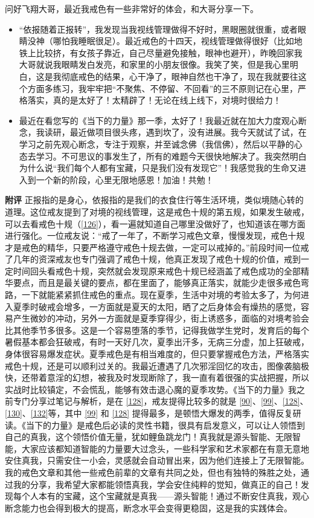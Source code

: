 \begin{case}
    问好飞翔大哥，最近我戒色有一些非常好的体会，和大哥分享一下。

    \begin{itemize}
        \item “依报随着正报转”，我发现当我视线管理做得不好时，黑眼圈就很重，或者眼睛没神（哪怕我睡眠很足）。最近戒色的十四天，视线管理做得很好（比如地铁上比较挤，有女孩子靠近，自己尽量避免接触，眼神也避开），昨晚回家我大哥就说我眼睛发白发亮，和家里的小朋友很像。我笑了笑，但是我心里明白，这是我彻底戒色的结果，心干净了，眼神自然也干净了，现在我就要往这个方面多练习，我牢牢把“不聚焦、不停留、不回看”的三不原则记在心里，严格落实，真的是太好了！太精辟了！无论在线上线下，对境时很给力！
        \item 最近在看您写的《当下的力量》那一季，太好了！我最近就在加大力度观心断念，我读研，最近做项目很头疼，遇到坎了，没有进展。我今天就试了试，在学习之前先观心断念，专注于观察，并至诚念佛（我信佛），然后以平静的心态去学习。不可思议的事发生了，所有的难题今天很快地解决了。我突然明白为什么说“我们每个人都有宝藏，只是我们没有发现它”！我感觉我的生命又进入到一个新的阶段，心里无限地感恩！加油！共勉！
    \end{itemize}

    \textbf{附评} 正报指的是身心，依报指的是我们的衣食住行等生活环境，类似境随心转的道理。这位戒友提到了对境的视线管理，这是戒色十规的第五规，如果发生破戒，可以去看戒色十规（\ref{126}），看一遍就知道自己哪里没做好了，也知道该在哪方面进行强化。一位戒友说：“戒了一年了，不断学习戒色文章，慢慢发现，戒色十规才是戒色的精华，只要严格遵守戒色十规去做，一定可以戒掉的。”前段时间一位戒了几年的资深戒友也专门强调了戒色十规，他真正发现了戒色十规的价值，戒到一定时间回头看戒色十规，突然就会发现原来戒色十规已经涵盖了戒色成功的全部精华要点，而且是最关键的要点，都在里面了，能够真正落实，就能少走很多戒色弯路，一下就能紧紧抓住戒色的重点。现在夏季，生活中对境的考验太多了，为何进入夏季时破戒会增多，一方面就是夏天的太阳，晒了之后身体会有燥热的感觉，容易产生微妙的冲动，另外一方面就是夏季穿得少，街上诱惑多，面临的对境考验会比其他季节多很多。这是一个容易堕落的季节，记得我做学生党时，发育后的每个暑假基本都会狂破戒，有时一天好几次，夏季出汗多，无病三分虚，加上狂破戒，身体很容易爆发症状。夏季戒色是有相当难度的，但只要掌握戒色方法，严格落实戒色十规，还是可以顺利过关的。我最近遭遇了几次邪淫回忆的攻击，图像袭脑极快，还带着意淫的幻想，被我及时发现断除了，我一直有着很强的实战把握，所以实战时比较镇定，不会慌乱，能够有效击退心魔的夏季攻势。《当下的力量》我之前专门分享过笔记与解析，是在 \ref{128}，戒友提得比较多的就是 \ref{90}、\ref{99}、\ref{128}、\ref{130}、\ref{132}等，其中 \ref{99} 和 \ref{128} 提得最多，是顿悟大爆发的两季，值得反复研读。《当下的力量》是戒色后必读的灵性书籍，很具有启发意义，可以让人领悟到自己的真我，这个领悟价值无量，犹如鲤鱼跳龙门！真我就是源头智能、无限智能，大家应该都知道智能的力量要大过念头，一些科学家和艺术家都在有意无意地安住真我，只需安住一小会，灵感就会自动冒出来，因为他们连接上了无限智能。我的戒色文章和其他一些戒色前辈的文章有共同之处，但也有独特的殊胜之处，通过我的分享，我希望大家都能领悟真我，学会安住纯粹的觉知，做真正的自己！发现每个人本有的宝藏，这个宝藏就是真我——源头智能！通过不断安住真我，观心断念能力也会得到极大的提高，断念水平会变得更稳固，这是我的实践体会。
\end{case}

